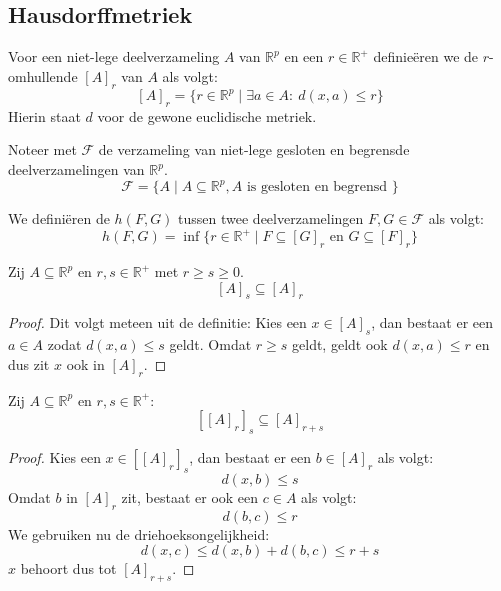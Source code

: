 \documentclass[main.tex]{subfiles}
\begin{document}
\subsection{Hausdorffmetriek}
\label{sec:hausdorffmetriek}

\begin{de}
  Voor een niet-lege deelverzameling $A$ van $\mathbb{R}^{p}$ en een $r\in \mathbb{R}^{+}$ definie\"eren we de $r$-omhullende $[A]_{r}$ van $A$ als volgt:
  \[ [A]_{r} = \{r \in \mathbb{R}^{p} \mid \exists a \in A:\ d(x,a) \le r \} \]
  Hierin staat $d$ voor de gewone euclidische metriek.
\end{de}

\begin{de}
  Noteer met $\mathcal{F}$ de verzameling van niet-lege gesloten en begrensde deelverzamelingen van $\mathbb{R}^{p}$.
  \[ \mathcal{F} = \{ A \mid A \subseteq \mathbb{R}^{p}, A \text{ is gesloten en begrensd } \} \]
\end{de}

\begin{de}
  We defini\"eren de  $h(F,G)$ tussen twee deelverzamelingen $F,G \in \mathcal{F}$ als volgt:
  \[ h(F,G) = \inf\{ r\in \mathbb{R}^{+} \mid F \subseteq [G]_{r} \text{ en } G \subseteq [F]_{r} \} \]
\end{de}

\begin{blem}
  \label{lem:omhullenden-in-elkaar}
  Zij $A \subseteq \mathbb{R}^{p}$ en $r,s\in\mathbb{R}^{+}$ met $r\ge s \ge 0$.
  \[ [A]_{s} \subseteq [A]_{r} \]

  \begin{proof}
    Dit volgt meteen uit de definitie:
    Kies een $x\in [A]_{s}$, dan bestaat er een $a\in A$ zodat $d(x,a) \le s$ geldt.
    Omdat $r \ge s$ geldt, geldt ook $d(x,a) \le r$ en dus zit $x$ ook in $[A]_{r}$.
  \end{proof}
\end{blem}

\begin{blem}
  Zij $A \subseteq \mathbb{R}^{p}$ en $r,s\in\mathbb{R}^{+}$:
  \[ \left[ [A]_{r}\right]_{s} \subseteq [A]_{r+s} \]

  \begin{proof}
    Kies een $x\in \left[[A]_{r}\right]_{s}$, dan bestaat er een $b\in [A]_{r}$ als volgt:
    \[ d(x,b) \le s \]
    Omdat $b$ in $[A]_{r}$ zit, bestaat er ook een $c\in A$ als volgt:
    \[ d(b,c) \le r \]
    We gebruiken nu de driehoeksongelijkheid:
    \[ d(x,c) \le d(x,b) + d(b,c) \le r + s \]
    $x$ behoort dus tot $[A]_{r+s}$.
  \end{proof}
\end{blem}
\end{document}
